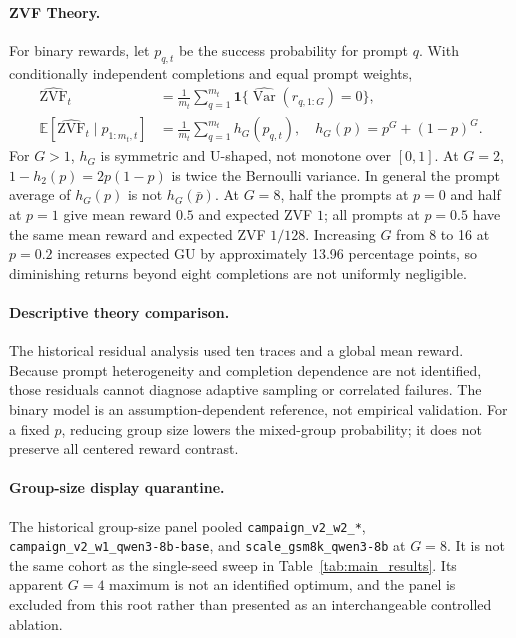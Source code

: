 \paragraph{ZVF Theory.}
\label{sec:zvf-theory}
For binary rewards, let $p_{q,t}$ be the success probability for prompt $q$.
With conditionally independent completions and equal prompt weights,
\begin{align}
\widehat{\mathrm{ZVF}}_t &= \frac1{m_t}\sum_{q=1}^{m_t}
 \mathbf{1}\{\widehat{\operatorname{Var}}(r_{q,1:G})=0\},\\
\mathbb E[\widehat{\mathrm{ZVF}}_t\mid p_{1:m_t,t}]
 &=\frac1{m_t}\sum_{q=1}^{m_t}h_G(p_{q,t}),\quad
 h_G(p)=p^G+(1-p)^G.
\end{align}
For $G>1$, $h_G$ is symmetric and U-shaped, not monotone over $[0,1]$.
At $G=2$, $1-h_2(p)=2p(1-p)$ is twice the Bernoulli variance.
In general the prompt average of $h_G(p)$ is not $h_G(\bar p)$.
At $G=8$, half the prompts at $p=0$ and half at $p=1$ give mean reward
$0.5$ and expected ZVF $1$; all prompts at $p=0.5$ have the same mean reward
and expected ZVF $1/128$. Increasing $G$ from 8 to 16 at $p=0.2$ increases
expected GU by approximately 13.96 percentage points, so diminishing returns
beyond eight completions are not uniformly negligible.

\paragraph{Descriptive theory comparison.}
The historical residual analysis used ten traces and a global mean reward.
Because prompt heterogeneity and completion dependence are not identified,
those residuals cannot diagnose adaptive sampling or correlated failures.
The binary model is an assumption-dependent reference, not empirical validation.
For a fixed $p$, reducing group size lowers the mixed-group probability; it
does not preserve all centered reward contrast.

\paragraph{Group-size display quarantine.}
The historical group-size panel pooled \texttt{campaign\_v2\_w2\_*},
\texttt{campaign\_v2\_w1\_qwen3-8b-base}, and
\texttt{scale\_gsm8k\_qwen3-8b} at $G=8$. It is not the same cohort as the
single-seed sweep in Table~\ref{tab:main_results}. Its apparent $G=4$
maximum is not an identified optimum, and the panel is excluded from this
root rather than presented as an interchangeable controlled ablation.


